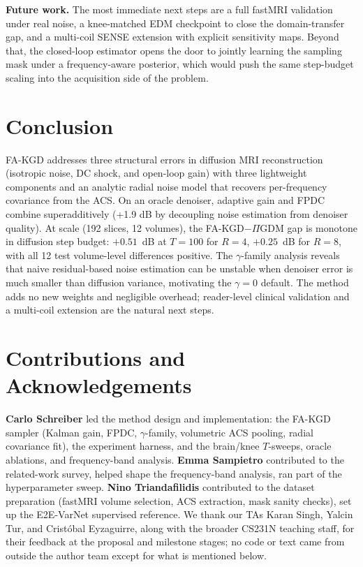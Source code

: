 \documentclass[10pt,twocolumn,letterpaper]{article}
\begin{document}
\textbf{Future work.} The most immediate next steps are a full fastMRI
validation under real noise, a knee-matched EDM checkpoint to close the
domain-transfer gap, and a multi-coil SENSE extension with explicit
sensitivity maps. Beyond that, the closed-loop estimator opens the door
to jointly learning the sampling mask under a frequency-aware posterior,
which would push the same step-budget scaling into the acquisition side
of the problem.

\section{Conclusion}
\label{sec:conclusion}

FA-KGD addresses three structural errors in diffusion MRI reconstruction (isotropic noise, DC shock, and open-loop gain) with three lightweight components and an analytic radial noise model that recovers per-frequency covariance from the ACS. On an oracle denoiser, adaptive gain and FPDC combine superadditively (+1.9 dB by decoupling noise estimation from denoiser quality). At scale (192 slices, 12 volumes), the FA-KGD$-\Pi$GDM gap is monotone in diffusion step budget: $+0.51$~dB at $T{=}100$ for $R{=}4$, $+0.25$~dB for $R{=}8$, with all 12 test volume-level differences positive. The $\gamma$-family analysis reveals that naive residual-based noise estimation can be unstable when denoiser error is much smaller than diffusion variance, motivating the $\gamma=0$ default. The method adds no new weights and negligible overhead; reader-level clinical validation and a multi-coil extension are the natural next steps.



\newpage
\section*{Contributions and Acknowledgements}
\label{sec:contrib}

\textbf{Carlo Schreiber} led the method design and implementation: the
FA-KGD sampler (Kalman gain, FPDC, $\gamma$-family, volumetric ACS pooling,
radial covariance fit), the experiment harness, and the brain/knee
$T$-sweeps, oracle ablations, and frequency-band analysis. 
\textbf{Emma Sampietro} contributed to the related-work survey, helped
shape the frequency-band analysis, ran part of the hyperparameter sweep.
\textbf{Nino Triandafilidis} contributed to the dataset preparation
(fastMRI volume selection, ACS extraction, mask sanity checks), set up the
E2E-VarNet supervised reference.
We thank our TAs Karan Singh, Yalcin Tur, and Cristóbal Eyzaguirre, along with the broader CS231N teaching staff, for their feedback at the proposal and milestone stages; no code or text came from outside the author team except for what is mentioned below.
\end{document}
